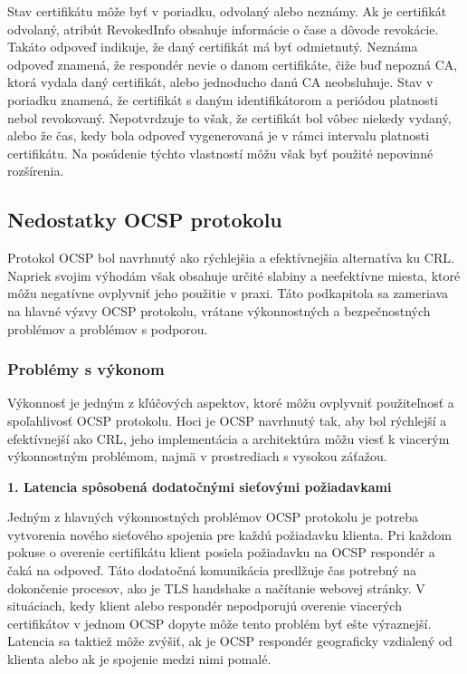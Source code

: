 \documentclass[12pt, twoside]{book}
\newcommand{\subsubsubsection}[1]{%
  \vspace{0.2em}  
  \textbf{#1} \\[0.2em]
  \hspace*{\parindent}
}
\begin{document}
Stav certifikátu môže byť v poriadku, odvolaný alebo neznámy. Ak je certifikát odvolaný, atribút RevokedInfo obsahuje informácie o čase a dôvode revokácie. Takáto odpoveď indikuje, že daný certifikát má byť odmietnutý. Neznáma odpoveď znamená, že respondér nevie o danom certifikáte, čiže buď nepozná CA, ktorá vydala daný certifikát, alebo jednoducho danú CA neobsluhuje. Stav v poriadku znamená, že certifikát s daným identifikátorom a periódou platnosti nebol revokovaný. Nepotvrdzuje to však, že certifikát bol vôbec niekedy vydaný, alebo že čas, kedy bola odpoveď vygenerovaná je v rámci intervalu platnosti certifikátu. Na posúdenie týchto vlastností môžu však byť použité nepovinné rozšírenia.\cite{rfc6960}

\subsection{Nedostatky OCSP protokolu}
Protokol OCSP bol navrhnutý ako rýchlejšia a efektívnejšia alternatíva ku CRL. Napriek svojim výhodám však obsahuje určité slabiny a neefektívne miesta, ktoré môžu negatívne ovplyvniť jeho použitie v praxi. Táto podkapitola sa zameriava na hlavné výzvy OCSP protokolu, vrátane výkonnostných a bezpečnostných problémov a problémov s podporou.

\subsubsection{Problémy s výkonom}
Výkonnosť je jedným z kľúčových aspektov, ktoré môžu ovplyvniť použiteľnosť a spoľahlivosť OCSP protokolu. Hoci je OCSP navrhnutý tak, aby bol rýchlejší a efektívnejší ako CRL, jeho implementácia a architektúra môžu viesť k viacerým výkonnostným problémom, najmä v prostrediach s vysokou záťažou.

\subsubsubsection{1. Latencia spôsobená dodatočnými sieťovými požiadavkami}
Jedným z hlavných výkonnostných problémov OCSP protokolu je potreba vytvorenia nového sieťového spojenia pre každú požiadavku klienta. Pri každom pokuse o overenie certifikátu klient posiela požiadavku na OCSP respondér a čaká na odpoveď. Táto dodatočná komunikácia predlžuje čas potrebný na dokončenie procesov, ako je TLS handshake a načítanie webovej stránky. V situáciach, kedy klient alebo respondér nepodporujú overenie viacerých certifikátov v jednom OCSP dopyte môže tento problém byť ešte výraznejší. Latencia sa taktiež môže zvýšiť, ak je OCSP respondér geograficky vzdialený od klienta alebo ak je spojenie medzi nimi pomalé. 
\end{document}
